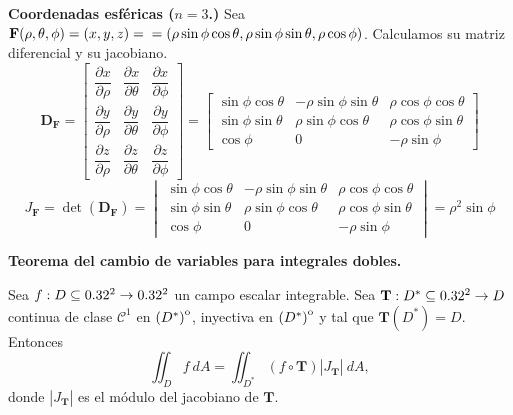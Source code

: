    \begin{example} \textbf{Coordenadas esféricas (\(n = 3\).)} Sea \( \mathbf{F}(\rho, \theta, \phi) = (x, y, z)=\\ = (\rho\sin\phi\cos\theta, \rho\sin\phi\sin\theta, \rho\cos\phi) \). Calculamos su matriz diferencial y su jacobiano. 
    \[
    \boldsymbol{D}_{\mathbf{F}} =
    \begin{bmatrix}
    \dfrac{\partial x}{\partial \rho} & \dfrac{\partial x}{\partial \theta} & \dfrac{\partial x}{\partial \phi} \\[.4cm]
    \dfrac{\partial y}{\partial \rho} & \dfrac{\partial y}{\partial \theta} & \dfrac{\partial y}{\partial \phi} \\[.4cm]
    \dfrac{\partial z}{\partial \rho} & \dfrac{\partial z}{\partial \theta} & \dfrac{\partial z}{\partial \phi}
    \end{bmatrix}
    =
    \begin{bmatrix}
    \sin\phi \cos\theta & -\rho \sin\phi \sin\theta & \rho \cos\phi \cos\theta \\
    \sin\phi \sin\theta & \rho \sin\phi \cos\theta & \rho \cos\phi \sin\theta \\
    \cos\phi & 0 & -\rho \sin\phi
    \end{bmatrix}
    \]
    \[
    J_\mathbf{F} = \det(\boldsymbol{D}_{\mathbf{F}}) = \begin{vmatrix}
        \sin\phi \cos\theta & -\rho \sin\phi \sin\theta & \rho \cos\phi \cos\theta \\
        \sin\phi \sin\theta & \rho \sin\phi \cos\theta & \rho \cos\phi \sin\theta \\
        \cos\phi & 0 & -\rho \sin\phi
        \end{vmatrix}=\rho^2 \sin\phi
    \]
    
    
    \end{example}

\begin{theorem} %
    \textbf{Teorema del cambio de variables para integrales dobles.} 
    
    Sea $f:D\subseteq0.32^2\to0.32^2$ un campo escalar integrable. Sea $\mathbf{T}:D^*\subseteq0.32^2\to D$ continua de clase $\mathcal{C}^1$ en ${\kern0pt(D^*)}^{\mathrm{o}}$, inyectiva en ${\kern0pt(D^*)}^{\mathrm{o}}$ y tal que $\mathbf{T}(D^*)=D$. Entonces
    \[
        \iint_D f\:dA=\iint_{D^*}(f\circ\mathbf{T})|J_\mathbf{T}|\:dA,
    \]
    donde $|J_\mathbf{T}|$ es el m\'odulo del jacobiano de $\mathbf{T}$.
\end{theorem}